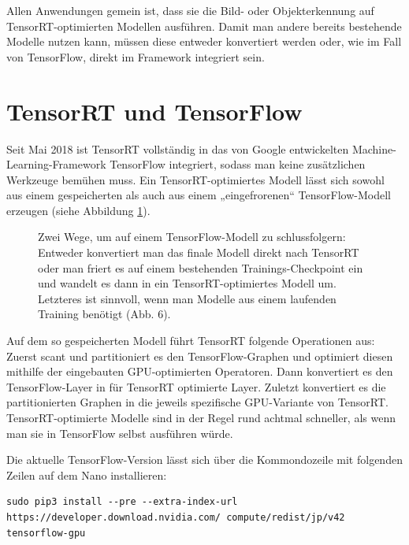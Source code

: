 Allen Anwendungen gemein ist, dass sie die Bild- oder Objekterkennung auf TensorRT-optimierten Modellen ausführen. Damit man andere bereits bestehende Modelle nutzen kann, müssen diese entweder konvertiert werden oder, wie im Fall von TensorFlow, direkt im Framework integriert sein. 

\section{TensorRT und TensorFlow}\label{todoTensorRT}

Seit Mai 2018 ist TensorRT vollständig in das von Google entwickelten Ma­chine-Learning-Framework TensorFlow inte­griert, sodass man keine zusätzlichen Werkzeuge bemühen muss. Ein TensorRT-­optimiertes Modell lässt sich sowohl aus einem gespeicherten als auch aus einem „eingefrorenen“ TensorFlow-Modell erzeugen (siehe Abbildung \ref{fig:Zwerg:Abb6}). 

\begin{figure}
	
	\caption[Zwei Wege, um auf einem TensorFlow-Modell zu schlussfolgern]{Zwei Wege, um auf einem TensorFlow-Modell zu schlussfolgern: Entweder konvertiert man das finale Modell direkt nach TensorRT oder man friert es auf einem bestehenden Trainings-Checkpoint ein und wandelt es dann in ein TensorRT-optimiertes Modell um. Letzteres ist sinnvoll, wenn man Modelle aus einem laufenden Training benötigt (Abb. 6). }\label{fig:Zwerg:Abb6}
\end{figure}


Auf dem so gespeicherten Modell führt TensorRT folgende Operationen aus: Zuerst scant und partitioniert es den TensorFlow-Graphen und optimiert diesen mithilfe der eingebauten GPU-optimierten Operatoren. Dann konvertiert es den TensorFlow-Layer in für TensorRT optimierte Layer. Zuletzt konvertiert es die partitionierten Graphen in die jeweils spezifische GPU-Variante von TensorRT. TensorRT-­optimierte Modelle sind in der Regel rund achtmal schneller, als wenn man sie in TensorFlow selbst ausführen würde. 

Die aktuelle TensorFlow-Version lässt sich über die Kommondozeile mit folgenden Zeilen auf dem Nano installieren: 

\begin{lstlisting}
sudo pip3 install --pre --extra-index-url https://developer.download.nvidia.com/ compute/redist/jp/v42 tensorflow-gpu
\end{lstlisting}

